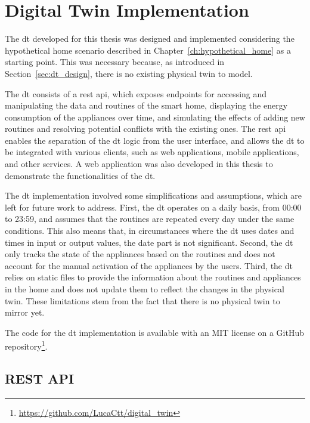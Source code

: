 \chapter{Digital Twin Implementation}\label{ch:digital_twin}

The \acrshort{dt} developed for this thesis was designed and implemented considering the hypothetical home scenario described in Chapter~\ref{ch:hypothetical_home} as a starting point. This was necessary because, as introduced in Section~\ref{sec:dt_design}, there is no existing physical twin to model. 

The \acrshort{dt} consists of a \acrfull{rest} \acrfull{api}, which exposes endpoints for accessing and manipulating the data and routines of the smart home, displaying the energy consumption of the appliances over time, and simulating the effects of adding new routines and resolving potential conflicts with the existing ones. The \acrshort{rest} \acrshort{api} enables the separation of the \acrshort{dt} logic from the user interface, and allows the \acrshort{dt} to be integrated with various clients, such as web applications, mobile applications, and other services. A web application was also developed in this thesis to demonstrate the functionalities of the \acrshort{dt}.

The \acrshort{dt} implementation involved some simplifications and assumptions, which are left for future work to address. First, the \acrshort{dt} operates on a daily basis, from 00:00 to 23:59, and assumes that the routines are repeated every day under the same conditions. This also means that, in circumstances where the \acrshort{dt} uses dates and times in input or output values, the date part is not significant. Second, the \acrshort{dt} only tracks the state of the appliances based on the routines and does not account for the manual activation of the appliances by the users. Third, the \acrshort{dt} relies on static files to provide the information about the routines and appliances in the home and does not update them to reflect the changes in the physical twin. These limitations stem from the fact that there is no physical twin to mirror yet.

The code for the \acrshort{dt} implementation is available with an MIT license on a GitHub repository\footnote{\url{https://github.com/LucaCtt/digital_twin}}.

\newpage

\section{REST API}

